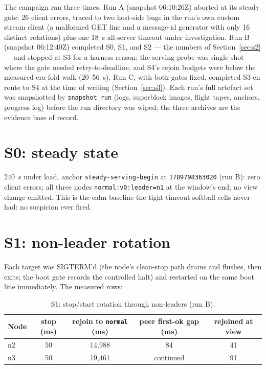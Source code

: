 \documentclass[10pt,journal,letterpaper]{IEEEtran}
\newcommand{\code}[1]{\texttt{\small #1}}
\newcommand{\ts}[1]{\code{#1}}
\begin{document}
The campaign ran three times. Run A (snapshot 06:10:26Z) aborted at
its steady gate: 26 client errors, traced to two host-side bugs in the
run's own custom stream client (a malformed GET line and a message-id
generator with only 16 distinct rotations) plus one 18~s all-server
timeout under investigation. Run B (snapshot 06:12:40Z) completed S0,
S1, and S2 --- the numbers of Section~\ref{sec:s2} --- and stopped at
S3 for a harness reason: the serving probe was single-shot where the
gate needed retry-to-deadline, and S4's rejoin budgets were below the
measured era-fold walk (20--56~s). Run C, with both gates fixed,
completed S3 en route to S4 at the time of writing
(Section~\ref{sec:s3}). Each run's full artefact set was snapshotted
by \code{snapshot\_run} (logs, superblock images, flight tapes,
anchors, progress log) before the run directory was wiped; the three
archives are the evidence base of record.

\section{S0: steady state}
\label{sec:s0}

240~s under load, anchor \ts{steady-serving-begin} at
\ts{1789798363020} (run B): zero client errors; all three nodes
\code{normal:v0:leader=n1} at the window's end; no view change
emitted. This is the calm baseline the tight-timeout softball cells
never had: no suspicion ever fired.

\section{S1: non-leader rotation}
\label{sec:s1}

Each target was SIGTERM'd (the node's clean-stop path drains and
flushes, then exits; the boot gate records the controlled halt) and
restarted on the same boot line immediately. The measured rows:

\begin{table}[h]
\centering
\caption{S1: stop/start rotation through non-leaders (run B).}
\label{tab:s1}
\begin{tabular}{@{}lcccc@{}}
\toprule
Node & stop (ms) & rejoin to \code{normal} (ms) & peer first-ok gap (ms) & rejoined at view\\
\midrule
n2 & 50 & 14{,}988 & 84 & 41\\
n3 & 50 & 19{,}461 & continued & 91\\
\bottomrule
\end{tabular}
\end{table}
\end{document}

